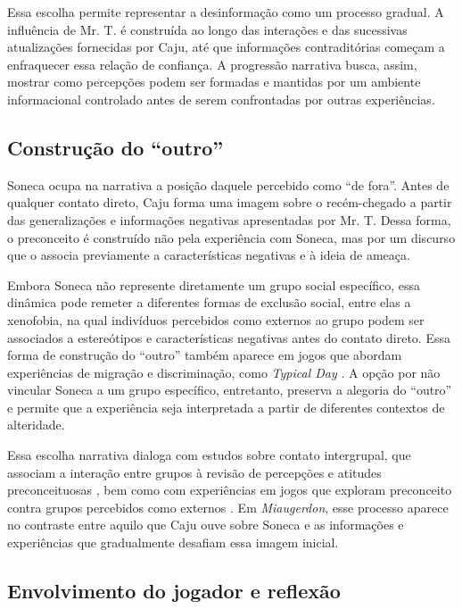 \documentclass[12pt]{article}
\begin{document}
Essa escolha permite representar a desinformação como um processo gradual. A influência de Mr. T. é construída ao longo das interações e das sucessivas atualizações fornecidas por Caju, até que informações contraditórias começam a enfraquecer essa relação de confiança. A progressão narrativa busca, assim, mostrar como percepções podem ser formadas e mantidas por um ambiente informacional controlado antes de serem confrontadas por outras experiências.

\subsection{Construção do ``outro''}

Soneca ocupa na narrativa a posição daquele percebido como ``de fora''. Antes de qualquer contato direto, Caju forma uma imagem sobre o recém-chegado a partir das generalizações e informações negativas apresentadas por Mr. T. Dessa forma, o preconceito é construído não pela experiência com Soneca, mas por um discurso que o associa previamente a características negativas e à ideia de ameaça.

Embora Soneca não represente diretamente um grupo social específico, essa dinâmica pode remeter a diferentes formas de exclusão social, entre elas a xenofobia, na qual indivíduos percebidos como externos ao grupo podem ser associados a estereótipos e características negativas antes do contato direto. Essa forma de construção do ``outro'' também aparece em jogos que abordam experiências de migração e discriminação, como \textit{Typical Day} \cite{typicalday}. A opção por não vincular Soneca a um grupo específico, entretanto, preserva a alegoria do ``outro'' e permite que a experiência seja interpretada a partir de diferentes contextos de alteridade.

Essa escolha narrativa dialoga com estudos sobre contato intergrupal, que associam a interação entre grupos à revisão de percepções e atitudes preconceituosas \cite{Pettigrew2006}, bem como com experiências em jogos que exploram preconceito contra grupos percebidos como externos \cite{a_path_out}. Em \textit{Miaugerdon}, esse processo aparece no contraste entre aquilo que Caju ouve sobre Soneca e as informações e experiências que gradualmente desafiam essa imagem inicial.

\subsection{Envolvimento do jogador e reflexão}
\end{document}

